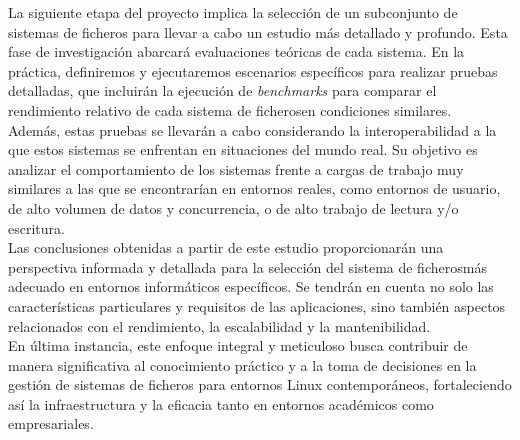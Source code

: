 La siguiente etapa del proyecto implica la selección de un subconjunto de sistemas de ficheros para llevar a cabo un estudio más detallado y profundo. Esta fase de investigación abarcará evaluaciones teóricas de cada sistema. En la práctica, definiremos y ejecutaremos escenarios específicos para realizar pruebas detalladas, que incluirán la ejecución de \textit{benchmarks} para comparar el rendimiento relativo de cada sistema de ficherosen condiciones similares.\\

Además, estas pruebas se llevarán a cabo considerando la interoperabilidad a la que estos sistemas se enfrentan en situaciones del mundo real. Su objetivo es analizar el comportamiento de los sistemas frente a cargas de trabajo muy similares a las que se encontrarían en entornos reales, como entornos de usuario, de alto volumen de datos y concurrencia, o de alto trabajo de lectura y/o escritura.\\

Las conclusiones obtenidas a partir de este estudio proporcionarán una perspectiva informada y detallada para la selección del sistema de ficherosmás adecuado en entornos informáticos específicos. Se tendrán en cuenta no solo las características particulares y requisitos de las aplicaciones, sino también aspectos relacionados con el rendimiento, la escalabilidad y la mantenibilidad.\\

En última instancia, este enfoque integral y meticuloso busca contribuir de manera significativa al conocimiento práctico y a la toma de decisiones en la gestión de sistemas de ficheros para entornos Linux contemporáneos, fortaleciendo así la infraestructura y la eficacia tanto en entornos académicos como empresariales.\\

\cleardoublepage
\thispagestyle{plain}
\begin{center}
\Large{}
\end{center}
\vskip1cm

